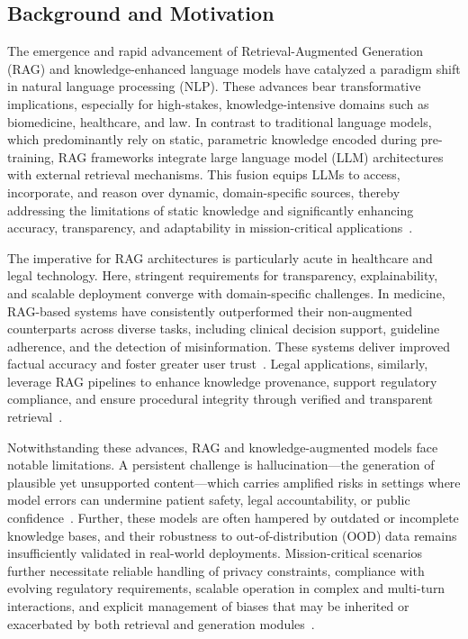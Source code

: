 \documentclass[11pt]{article}
\begin{document}
\subsection{Background and Motivation}

The emergence and rapid advancement of Retrieval-Augmented Generation (RAG) and knowledge-enhanced language models have catalyzed a paradigm shift in natural language processing (NLP). These advances bear transformative implications, especially for high-stakes, knowledge-intensive domains such as biomedicine, healthcare, and law. In contrast to traditional language models, which predominantly rely on static, parametric knowledge encoded during pre-training, RAG frameworks integrate large language model (LLM) architectures with external retrieval mechanisms. This fusion equips LLMs to access, incorporate, and reason over dynamic, domain-specific sources, thereby addressing the limitations of static knowledge and significantly enhancing accuracy, transparency, and adaptability in mission-critical applications~\cite{ref4,ref5,ref10,ref14,ref15,ref16,ref17,ref46,ref47,ref48,ref51,ref52,ref54,ref55,ref64}.

The imperative for RAG architectures is particularly acute in healthcare and legal technology. Here, stringent requirements for transparency, explainability, and scalable deployment converge with domain-specific challenges. In medicine, RAG-based systems have consistently outperformed their non-augmented counterparts across diverse tasks, including clinical decision support, guideline adherence, and the detection of misinformation. These systems deliver improved factual accuracy and foster greater user trust~\cite{ref1,ref2,ref3,ref4,ref5,ref6,ref7,ref8,ref29,ref31,ref42,ref48,ref51,ref52,ref54,ref55,ref63}. Legal applications, similarly, leverage RAG pipelines to enhance knowledge provenance, support regulatory compliance, and ensure procedural integrity through verified and transparent retrieval~\cite{ref4,ref5,ref8,ref10,ref14,ref16}.

Notwithstanding these advances, RAG and knowledge-augmented models face notable limitations. A persistent challenge is hallucination—the generation of plausible yet unsupported content—which carries amplified risks in settings where model errors can undermine patient safety, legal accountability, or public confidence~\cite{ref15,ref38,ref45,ref46,ref47,ref50,ref52,ref54,ref55,ref64}. Further, these models are often hampered by outdated or incomplete knowledge bases, and their robustness to out-of-distribution (OOD) data remains insufficiently validated in real-world deployments. Mission-critical scenarios further necessitate reliable handling of privacy constraints, compliance with evolving regulatory requirements, scalable operation in complex and multi-turn interactions, and explicit management of biases that may be inherited or exacerbated by both retrieval and generation modules~\cite{ref15,ref38,ref45,ref46,ref47,ref50,ref52,ref54,ref55,ref64}.
\end{document}
